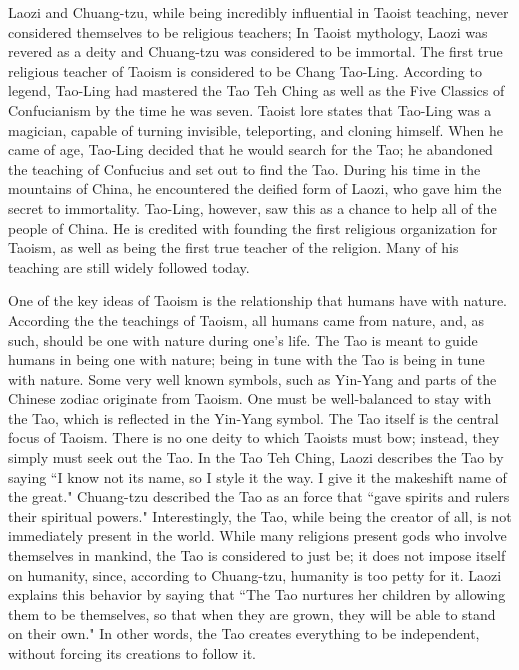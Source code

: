 \documentclass[12pt]{hw}
\begin{document}
Laozi and Chuang-tzu, while being incredibly influential in Taoist teaching, never considered themselves to be religious teachers; In Taoist mythology, Laozi was revered as a deity and Chuang-tzu was considered to be immortal. The first true religious teacher of Taoism is considered to be Chang Tao-Ling. According to legend, Tao-Ling had mastered the Tao Teh Ching as well as the Five Classics of Confucianism by the time he was seven. Taoist lore states that Tao-Ling was a magician, capable of turning invisible, teleporting, and cloning himself. When he came of age, Tao-Ling decided that he would search for the Tao; he abandoned the teaching of Confucius and set out to find the Tao. During his time in the mountains of China, he encountered the deified form of Laozi, who gave him the secret to immortality. Tao-Ling, however, saw this as a chance to help all of the people of China. He is credited with founding the first religious organization for Taoism, as well as being the first true teacher of the religion. Many of his teaching are still widely followed today.

One of the key ideas of Taoism is the relationship that humans have with nature. According the the teachings of Taoism, all humans came from nature, and, as such, should be one with nature during one's life. The Tao is meant to guide humans in being one with nature; being in tune with the Tao is being in tune with nature. Some very well known symbols, such as Yin-Yang and parts of the Chinese zodiac originate from Taoism. One must be well-balanced to stay with the Tao, which is reflected in the Yin-Yang symbol. The Tao itself is the central focus of Taoism. There is no one deity to which Taoists must bow; instead, they simply must seek out the Tao. In the Tao Teh Ching, Laozi describes the Tao by saying ``I know not its name, so I style it the way. I give it the makeshift name of the great." Chuang-tzu described the Tao as an force that ``gave spirits and rulers their spiritual powers." Interestingly, the Tao, while being the creator of all, is not immediately present in the world. While many religions present gods who involve themselves in mankind, the Tao is considered to just be; it does not impose itself on humanity, since, according to Chuang-tzu, humanity is too petty for it. Laozi explains this behavior by saying that ``The Tao nurtures her children by allowing them to be themselves, so that when they are grown, they will be able to stand on their own." In other words, the Tao creates everything to be independent, without forcing its creations to follow it.
\end{document}
